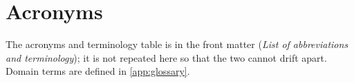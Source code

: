 \chapter{Acronyms}\label{app:acronyms}
The acronyms and terminology table is in the front matter (\emph{List of abbreviations and terminology}); it is not repeated here so that the two cannot drift apart. Domain terms are defined in \cref{app:glossary}.
